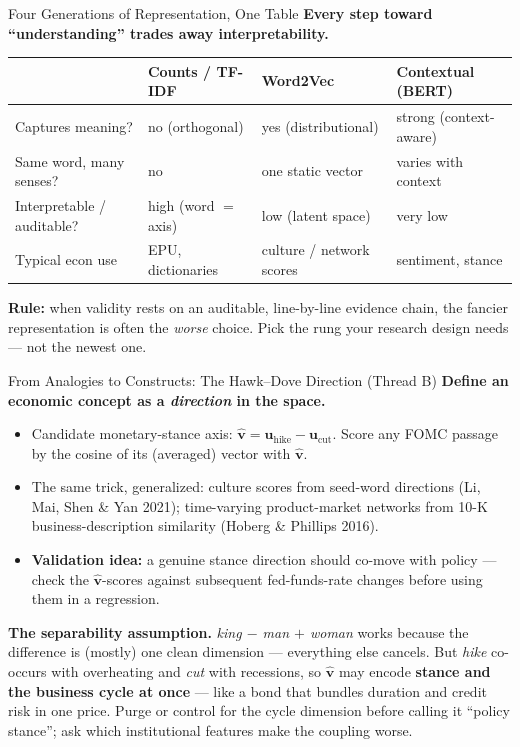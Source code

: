 \begin{frame}{Four Generations of Representation, One Table}
\textbf{Every step toward ``understanding'' trades away interpretability.}
\begin{center}
\renewcommand{\arraystretch}{1.35}
\small
\begin{tabular}{p{2.7cm} p{2.0cm} p{2.4cm} p{3.0cm}}
\toprule
 & \textbf{Counts / TF-IDF} & \textbf{Word2Vec} & \textbf{Contextual (BERT)} \\
\midrule
Captures meaning? & no (orthogonal) & yes (distributional) & strong (context-aware) \\
Same word, many senses? & no & one static vector & varies with context \\
Interpretable / auditable? & high (word $=$ axis) & low (latent space) & very low \\
Typical econ use & EPU, dictionaries & culture / network scores & sentiment, stance \\
\bottomrule
\end{tabular}
\end{center}
\medskip
\textbf{Rule:} when validity rests on an auditable, line-by-line evidence chain, the fancier representation is often the \emph{worse} choice. Pick the rung your research design needs --- not the newest one.
\end{frame}

\begin{frame}{From Analogies to Constructs: The Hawk--Dove Direction (Thread B)}
\textbf{Define an economic concept as a \emph{direction} in the space.}
\begin{itemize}
\item Candidate monetary-stance axis: $\hat{\mathbf{v}} = \mathbf{u}_{\text{hike}} - \mathbf{u}_{\text{cut}}$. Score any FOMC passage by the cosine of its (averaged) vector with $\hat{\mathbf{v}}$.
\item The same trick, generalized: culture scores from seed-word directions (Li, Mai, Shen \& Yan 2021); time-varying product-market networks from 10-K business-description similarity (Hoberg \& Phillips 2016).
\item \textbf{Validation idea:} a genuine stance direction should co-move with policy --- check the $\hat{\mathbf{v}}$-scores against subsequent fed-funds-rate changes before using them in a regression.
\end{itemize}
\medskip
\begin{cautionbox}
\textbf{The separability assumption.} \emph{king $-$ man $+$ woman} works because the difference is (mostly) one clean dimension --- everything else cancels. But \emph{hike} co-occurs with overheating and \emph{cut} with recessions, so $\hat{\mathbf{v}}$ may encode \textbf{stance and the business cycle at once} --- like a bond that bundles duration and credit risk in one price. Purge or control for the cycle dimension before calling it ``policy stance''; ask which institutional features make the coupling worse.
\end{cautionbox}
\end{frame}


